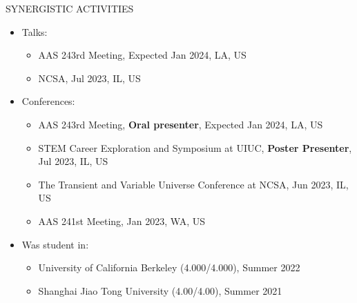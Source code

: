\documentclass[10pt]{article} %
\begin{document}
\newpage

\begin{section}{SYNERGISTIC ACTIVITIES}
    
\begin{itemize}[leftmargin=1.5em]
    \item Talks: 
    \begin{itemize}[leftmargin=1.5em]
        \item AAS 243rd Meeting, Expected Jan 2024, LA, US
        \item NCSA, Jul 2023, IL, US
    \end{itemize}
    \item Conferences: 
    \begin{itemize}[leftmargin=1.5em]
        \item AAS 243rd Meeting, \textbf{Oral presenter}, Expected Jan 2024, LA, US
        \item STEM Career Exploration and Symposium at UIUC, \textbf{Poster Presenter}, Jul 2023, IL, US
        \item The Transient and Variable Universe Conference at NCSA, Jun 2023, IL, US
        \item AAS 241st Meeting, Jan 2023, WA, US
    \end{itemize}
    \item Was student in: 
    \begin{itemize}[leftmargin=1.5em]
        \item University of California Berkeley (4.000/4.000), Summer 2022
        \item Shanghai Jiao Tong University (4.00/4.00), Summer 2021
    \end{itemize}
\end{itemize}

\end{section}
\end{document}
